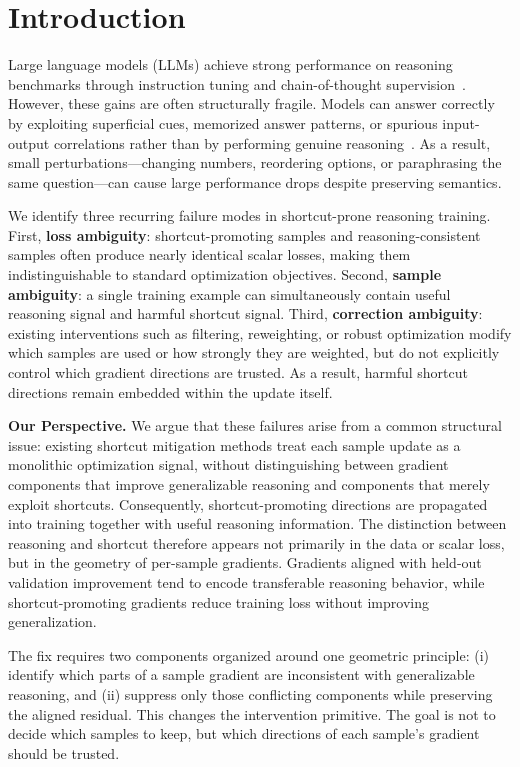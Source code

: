 \section{Introduction}

Large language models (LLMs) achieve strong performance on reasoning benchmarks through instruction tuning and chain-of-thought supervision~\cite{wei2022chain,wang2022self,kojima2022large}. However, these gains are often structurally fragile. Models can answer correctly by exploiting superficial cues, memorized answer patterns, or spurious input-output correlations rather than by performing genuine reasoning~\cite{geirhos2020shortcut,mccoy2019right,niven2019probing}. As a result, small perturbations---changing numbers, reordering options, or paraphrasing the same question---can cause large performance drops despite preserving semantics.

We identify three recurring failure modes in shortcut-prone reasoning training. First, \textbf{loss ambiguity}: shortcut-promoting samples and reasoning-consistent samples often produce nearly identical scalar losses, making them indistinguishable to standard optimization objectives. Second, \textbf{sample ambiguity}: a single training example can simultaneously contain useful reasoning signal and harmful shortcut signal. Third, \textbf{correction ambiguity}: existing interventions such as filtering, reweighting, or robust optimization modify which samples are used or how strongly they are weighted, but do not explicitly control which gradient directions are trusted. As a result, harmful shortcut directions remain embedded within the update itself.

\textbf{Our Perspective.} We argue that these failures arise from a common structural issue: existing shortcut mitigation methods treat each sample update as a monolithic optimization signal, without distinguishing between gradient components that improve generalizable reasoning and components that merely exploit shortcuts. Consequently, shortcut-promoting directions are propagated into training together with useful reasoning information. The distinction between reasoning and shortcut therefore appears not primarily in the data or scalar loss, but in the geometry of per-sample gradients. Gradients aligned with held-out validation improvement tend to encode transferable reasoning behavior, while shortcut-promoting gradients reduce training loss without improving generalization.

The fix requires two components organized around one geometric principle: (i) identify which parts of a sample gradient are inconsistent with generalizable reasoning, and (ii) suppress only those conflicting components while preserving the aligned residual. This changes the intervention primitive. The goal is not to decide which samples to keep, but which directions of each sample's gradient should be trusted.

